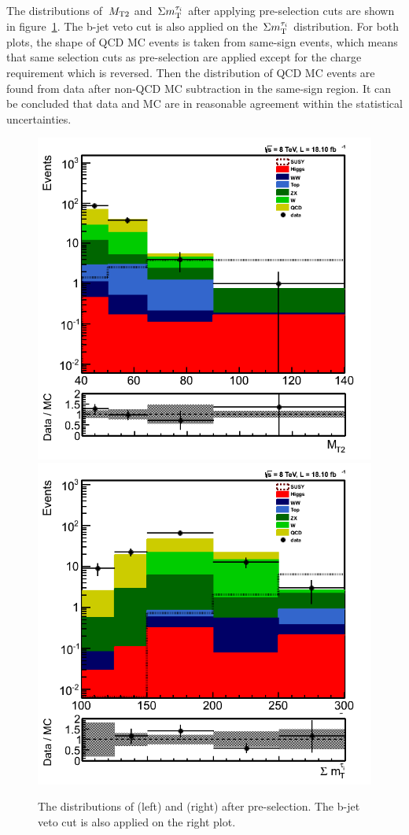 The distributions of $\,{M_{\rm T2}}$ and $\,\Sigma m_{\rm T}^{\tau_i}$ after applying pre-selection cuts are shown in figure~\ref{fig:comparison}.
The b-jet veto cut is also applied on the $\,\Sigma m_{\rm T}^{\tau_i}$ distribution. For both plots, the shape of QCD MC events
is taken from same-sign events, which means that same selection cuts as pre-selection are applied except for the charge
requirement which is reversed. Then the distribution of QCD MC events are found from data after non-QCD MC subtraction
in the same-sign region. It can be concluded that data and MC are in reasonable agreement within the statistical uncertainties.
\begin{figure}[!Hhtb]
\centering
\includegraphics[angle=0,scale=0.35]{TauTauFigs/MT2_SSQCD_dataunblinding.png}
\includegraphics[angle=0,scale=0.35]{TauTauFigs/SumMT_SSQCD_dataunblinding.png} \\
\caption{The distributions of \mttwo (left) and \SumMT (right) after pre-selection. The b-jet veto cut is also applied on the right plot.}
\label{fig:comparison}
\end{figure}